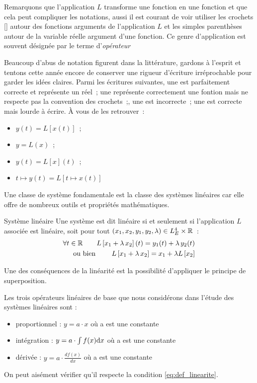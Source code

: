 	\begin{remark}{}
	    Remarquons que l'application $L$ transforme une fonction en une fonction et que cela peut compliquer les notations, aussi il est courant de voir utiliser les crochets [] autour des fonctions arguments de l'application $L$ et les simples parenthèses autour de la variable réelle argument d'une fonction. Ce genre d'application est souvent désignée par le terme d'\emph{opérateur}
	    
	    Beaucoup d'abus de notation figurent dans la littérature, gardons à l'esprit et tentons cette année encore de conserver une rigueur d'écriture irréprochable pour garder les idées claires. Parmi les écritures suivantes, une est parfaitement correcte et représente un réel~; une représente correctement une fontion mais ne respecte pas la convention des crochets~;, une est incorrecte~; une est correcte mais lourde à écrire. À vous de les retrouver~:
	    \begin{itemize}
	        \item $y(t) = L[x(t)]$~;
	        \item $y = L(x)$~;
	        \item $y(t) = L[x](t)$~;
	        \item $t\mapsto y(t) = L[t\mapsto x(t)]$
	    \end{itemize}{}
	\end{remark}
	
	Une classe de système fondamentale est la classe des systèmes linéaires car elle offre de nombreux outils et propriétés mathématiques.
	\begin{definition}{Système linéaire}
	\label{def:linearite}
	Une système est dit linéaire si et seulement si l'application $L$ associée est linéaire, soit
	pour tout $\left(x_1,x_2,y_1,y_2,\lambda\right) \in L_E^4 \times \mathbb{R}$~:
	\begin{eqnarray}
    	\label{eq:def_linearite}
	    \forall t \in \mathbb{R} \qquad L\left[x_1 + \lambda\, x_2\right](t) = y_1(t) + \lambda\,y_2(t) \nonumber\\
	    \text{ou bien } \qquad L\left[x_1 + \lambda\,x_2\right] = x_1 +\lambda L\left[x_2 \right]
	\end{eqnarray}
	\end{definition}
	

	Une des conséquences de la linéarité est la possibilité d'appliquer le principe de superposition.
	
	Les trois opérateurs linéaires de base que nous considérons dans l'étude des systèmes linéaires sont :
	\begin{itemize}
		\item proportionnel : $y = a\cdot x$ où a est une constante 
		\item intégration : $y = a\cdot \int f(x) \mathrm{d} x $ où a est une constante
		\item dérivée : $y = a\cdot \frac{df(x)}{dx} $ où a est une constante
	\end{itemize}
	On peut aisément vérifier qu'il respecte la condition \ref{eq:def_linearite}.
	
